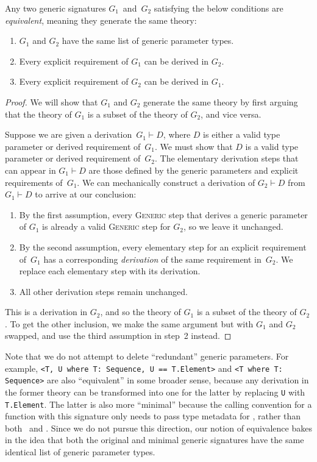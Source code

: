 \documentclass[../generics]{subfiles}
\begin{document}
\begin{proposition}\label{equiv generic signatures}
Any two generic signatures $G_1$~and~$G_2$ satisfying the below conditions are \emph{equivalent}, meaning they generate the same theory:
\begin{enumerate}
\item $G_1$ and $G_2$ have the same list of generic parameter types.
\item Every explicit requirement of $G_1$ can be derived in $G_2$.
\item Every explicit requirement of $G_2$ can be derived in $G_1$.
\end{enumerate}
\end{proposition}
\begin{proof}
We will show that $G_1$ and $G_2$ generate the same theory by first arguing that the theory of $G_1$ is a subset of the theory of $G_2$, and vice versa.

Suppose we are given a derivation~$G_1\vdash D$, where $D$ is either a valid type parameter or derived requirement of~$G_1$. We must show that $D$ is a valid type parameter or derived requirement of~$G_2$. The elementary derivation steps that can appear in $G_1\vdash D$ are those defined by the generic parameters and explicit requirements of~$G_1$. We can mechanically construct a derivation of $G_2\vdash D$ from $G_1\vdash D$ to arrive at our conclusion:
\begin{enumerate}
\item By the first assumption, every \textsc{Generic} step that derives a generic parameter of $G_1$ is already a valid \textsc{Generic} step for $G_2$, so we leave it unchanged.
\item By the second assumption, every elementary step for an explicit requirement of~$G_1$ has a corresponding \emph{derivation} of the same requirement in~$G_2$. We replace each elementary step with its derivation.
\item All other derivation steps remain unchanged.
\end{enumerate}
This is a derivation in $G_2$, and so the theory of $G_1$ is a subset of the theory of $G_2$. To get the other inclusion, we make the same argument but with $G_1$ and $G_2$ swapped, and use the third assumption in step~2 instead.
\end{proof}

Note that we do not attempt to delete ``redundant'' generic parameters. For example, \verb|<T, U where T: Sequence, U == T.Element>| and \verb|<T where T: Sequence>| are also ``equivalent'' in some broader sense, because any derivation in the former theory can be transformed into one for the latter by replacing \verb|U| with \verb|T.Element|. The latter is also more ``minimal'' because the calling convention for a function with this signature only needs to pass type metadata for \tT, rather than both \tT\ and \tU. Since we do not pursue this direction, our notion of equivalence bakes in the idea that both the original and minimal generic signatures have the same identical list of generic parameter types.
\end{document}
